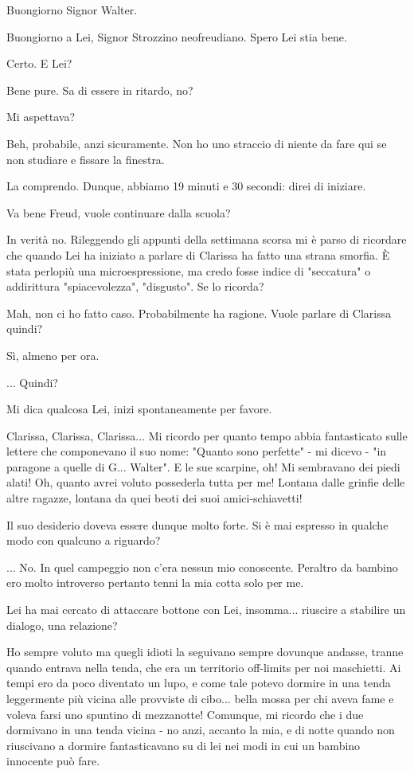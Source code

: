 \documentclass[a4paper,12pt]{article}
\newcommand{\Walter}{\speak{W}}
\newcommand{\Pollazzi}{\speak{P}}
\begin{document}
\begin{dialogue}

\Pollazzi Buongiorno Signor Walter.

\Walter Buongiorno a Lei, Signor Strozzino neofreudiano. Spero Lei stia bene.

\Pollazzi Certo. E Lei?

\Walter Bene pure. Sa di essere in ritardo, no?

\Pollazzi Mi aspettava?

\Walter Beh, probabile, anzi sicuramente. Non ho uno straccio di niente da fare qui se non studiare e fissare la finestra.

\Pollazzi La comprendo. Dunque, abbiamo 19 minuti e 30 secondi: direi di iniziare.

\Walter Va bene Freud, vuole continuare dalla scuola?

\Pollazzi In verità no. Rileggendo gli appunti della settimana scorsa mi è parso di ricordare che quando Lei ha iniziato a parlare di Clarissa ha fatto una strana smorfia. È stata perlopiù una microespressione, ma credo fosse indice di "seccatura" o addirittura "spiacevolezza", "disgusto". Se lo ricorda?

\Walter Mah, non ci ho fatto caso. Probabilmente ha ragione. Vuole parlare di Clarissa quindi?

\Pollazzi Sì, almeno per ora.

\Walter ... Quindi?

\Pollazzi Mi dica qualcosa Lei, inizi spontaneamente per favore.

\Walter Clarissa, Clarissa, Clarissa... Mi ricordo per quanto tempo abbia fantasticato sulle lettere che componevano il suo nome: "Quanto sono perfette" - mi dicevo - "in paragone a quelle di G... Walter". E le sue scarpine, oh! Mi sembravano dei piedi alati! Oh, quanto avrei voluto possederla tutta per me! Lontana dalle grinfie delle altre ragazze, lontana da quei beoti dei suoi amici-schiavetti!

\Pollazzi Il suo desiderio doveva essere dunque molto forte. Si è mai espresso in qualche modo con qualcuno a riguardo?

\Walter ... No. In quel campeggio non c'era nessun mio conoscente. Peraltro da bambino ero molto introverso pertanto tenni la mia cotta solo per me.

\Pollazzi Lei ha mai cercato di attaccare bottone con Lei, insomma... riuscire a stabilire un dialogo, una relazione?

\Walter Ho sempre voluto ma quegli idioti la seguivano sempre dovunque andasse, tranne quando entrava nella tenda, che era un territorio off-limits per noi maschietti. Ai tempi ero da poco diventato un lupo, e come tale potevo dormire in una tenda leggermente più vicina alle provviste di cibo... bella mossa per chi aveva fame e voleva farsi uno spuntino di mezzanotte! Comunque, mi ricordo che i due dormivano in una tenda vicina - no anzi, accanto la mia, e di notte quando non riuscivano a dormire fantasticavano su di lei nei modi in cui un bambino innocente può fare.


\end{dialogue}
\end{document}
